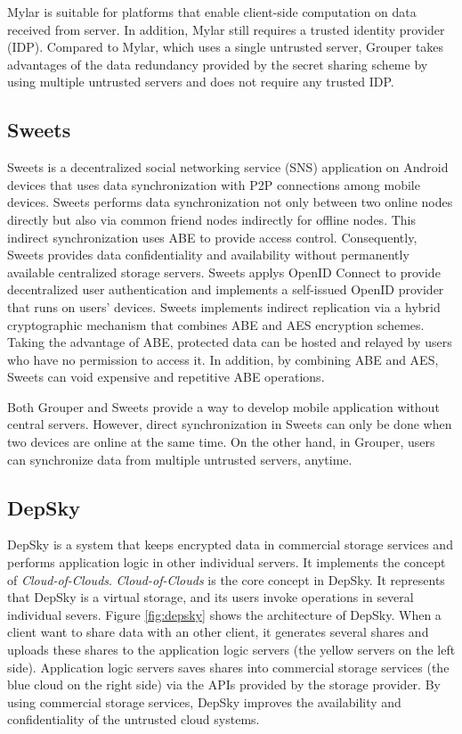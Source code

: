 \documentclass[a4paper,11pt]{report}
\begin{document}
Mylar is suitable for platforms that enable client-side computation on data received from server.
In addition, Mylar still requires a trusted identity provider (IDP).
Compared to Mylar, which uses a single untrusted server, Grouper takes advantages of the data redundancy provided by the secret sharing scheme by using multiple untrusted servers and does not require any trusted IDP.

\subsection{Sweets}
Sweets\cite{sweets} is a decentralized social networking service (SNS) application on Android devices that uses data synchronization with P2P connections among mobile devices. 
Sweets performs data synchronization not only between two online nodes directly but also via common friend nodes indirectly for offline nodes.
This indirect synchronization uses ABE to provide access control.
Consequently, Sweets provides data confidentiality and availability without permanently available centralized storage servers.
Sweets applys OpenID Connect to provide decentralized user authentication and implements a self-issued OpenID provider that runs on users’ devices.
Sweets implements indirect replication via a hybrid cryptographic mechanism that combines ABE and AES encryption schemes. 
Taking the advantage of ABE, protected data can be hosted and relayed by users who have no permission to access it. 
In addition, by combining ABE and AES, Sweets can void expensive and repetitive ABE operations.

Both Grouper and Sweets provide a way to develop mobile application without central servers.
However, direct synchronization in Sweets can only be done when two devices are online at the same time. 
On the other hand, in Grouper, users can synchronize data from multiple untrusted servers, anytime.

\subsection{DepSky}

DepSky\cite{bessani2013depsky} is a system that keeps encrypted data in commercial storage services and performs application logic in other individual servers.
It implements the concept of \emph{Cloud-of-Clouds}.  
\emph{Cloud-of-Clouds} is the core concept in DepSky.
It represents that DepSky is a virtual storage, and its users invoke operations in several individual severs. 
Figure \ref{fig:depsky} shows the architecture of DepSky.
When a client want to share data with an other client, it generates several shares and uploads these shares to the application logic servers (the yellow servers on the left side).
Application logic servers saves shares into commercial storage services (the blue cloud on the right side) via the APIs provided by the storage provider.
By using commercial storage services, DepSky improves the availability and confidentiality of the untrusted cloud systems.
\end{document}
